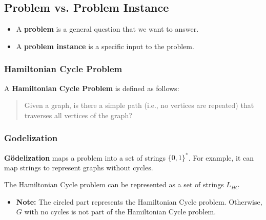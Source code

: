 \subsection{Problem vs. Problem Instance}
\begin{definition}
    \begin{itemize}
        \item A \textbf{problem} is a general question that we want to answer.
        \item A \textbf{problem instance} is a specific input to the problem.
    \end{itemize}
\end{definition}

\subsubsection{Hamiltonian Cycle Problem}
\begin{definition}
    A \textbf{Hamiltonian Cycle Problem} is defined as follows:
    \begin{quote}
    Given a graph, is there a simple path (i.e., no vertices are repeated) that traverses all vertices of the graph?
    \end{quote}
\end{definition}

\subsubsection{Godelization}
\begin{definition}
    \textbf{Gödelization} maps a problem into a set of strings $\{0, 1\}^*$. For example, it can map strings to represent graphs without cycles.
\end{definition}

\begin{example}
    The Hamiltonian Cycle problem can be represented as a set of strings $L_{HC}$
    \begin{itemize}
        \item \textbf{Note:} The circled part represents the Hamiltonian Cycle problem. Otherwise, $G$ with no cycles is not part of the Hamiltonian Cycle problem.
    \end{itemize}
\end{example}

